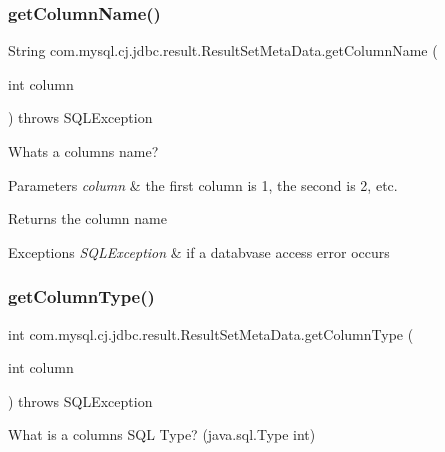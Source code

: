 \subsubsection{\texorpdfstring{get\+Column\+Name()}{getColumnName()}}
{\footnotesize\ttfamily String com.\+mysql.\+cj.\+jdbc.\+result.\+Result\+Set\+Meta\+Data.\+get\+Column\+Name (\begin{DoxyParamCaption}\item[{int}]{column }\end{DoxyParamCaption}) throws S\+Q\+L\+Exception}

What\textquotesingle{}s a column\textquotesingle{}s name?


\begin{DoxyParams}{Parameters}
{\em column} & the first column is 1, the second is 2, etc.\\
\hline
\end{DoxyParams}
\begin{DoxyReturn}{Returns}
the column name
\end{DoxyReturn}

\begin{DoxyExceptions}{Exceptions}
{\em S\+Q\+L\+Exception} & if a databvase access error occurs \\
\hline
\end{DoxyExceptions}
\mbox{\label{classcom_1_1mysql_1_1cj_1_1jdbc_1_1result_1_1_result_set_meta_data_af71205559fb1123e6d8950c5a67a69e3}} 
\subsubsection{\texorpdfstring{get\+Column\+Type()}{getColumnType()}}
{\footnotesize\ttfamily int com.\+mysql.\+cj.\+jdbc.\+result.\+Result\+Set\+Meta\+Data.\+get\+Column\+Type (\begin{DoxyParamCaption}\item[{int}]{column }\end{DoxyParamCaption}) throws S\+Q\+L\+Exception}

What is a column\textquotesingle{}s S\+QL Type? (java.\+sql.\+Type int)


